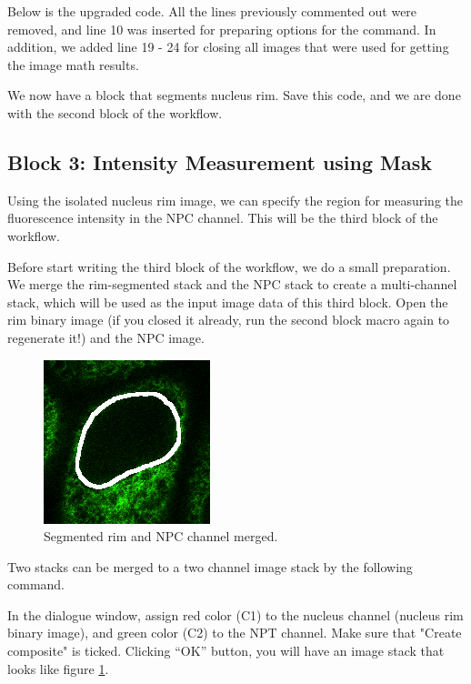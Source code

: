 Below is the upgraded code. All the lines previously commented out were removed, and line 10 was inserted for preparing options for the  command. In addition, we added line 19 - 24 for closing all images that were used for getting the image math results. 



We now have a block that segments nucleus rim. Save this code, and we are done with the second block of the workflow. 

\subsection{Block 3: Intensity Measurement using Mask}

Using the isolated nucleus rim image, we can specify the region for measuring the fluorescence intensity in the NPC channel. This will be the third block of the workflow. 

Before start writing the third block of the workflow, we do a small preparation. We merge the rim-segmented stack and the NPC stack to create a multi-channel stack, which will be used as the input image data of this third block. Open the rim binary image (if you closed it already, run the second block macro again to regenerate it!) and the NPC image.  

\begin{figure}[!ht]
\begin{center}
\includegraphics[scale=1.0]{fig/NucRimNPTMerged.png}
\caption{Segmented rim and NPC channel merged.}
\label{fig:NucRimMerged}
\end{center}
\end{figure}

Two stacks can be merged to a two channel image stack by the following command.  


In the dialogue window, assign red color (C1) to the nucleus channel (nucleus rim binary image), and  green color (C2) to the NPT channel. Make sure that "Create composite" is ticked. Clicking ``OK'' button, you will have an image stack that looks like figure \ref{fig:NucRimMerged}.

